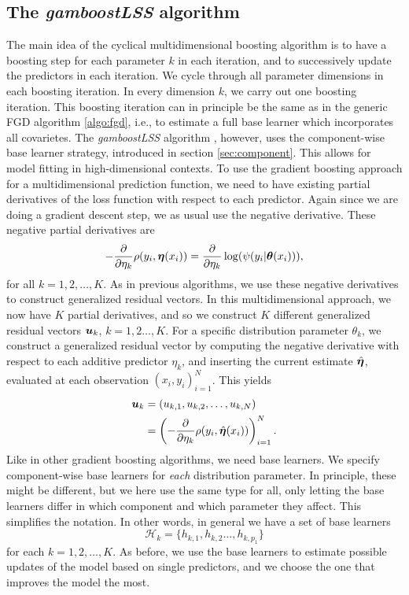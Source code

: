 \subsection{The \textit{gamboostLSS} algorithm}
The main idea of the cyclical multidimensional boosting algorithm is to have a boosting step for each parameter $k$ in each iteration, and to successively update the predictors in each iteration.
We cycle through all parameter dimensions in each boosting iteration.
In every dimension $k$, we carry out one boosting iteration.
This boosting iteration can in principle be the same as in the generic FGD algorithm \eqref{algo:fgd}, i.e., to estimate a full base learner which incorporates all covarietes.
The \textit{gamboostLSS} algorithm \citep{gamboostlss-paper}, however, uses the component-wise base learner strategy, introduced in section \ref{sec:component}.
This allows for model fitting in high-dimensional contexts.
To use the gradient boosting approach for a multidimensional prediction function, we need to have existing partial derivatives of the loss function with respect to each predictor.
Again since we are doing a gradient descent step, we as usual use the negative derivative.
These negative partial derivatives are
\begin{equation*}
    -\frac{\partial}{\partial\eta_k}\rho(y_i,\boldsymbol{\eta}(x_i))=\frac{\partial}{\partial\eta_k}\log(\psi(y_i|\boldsymbol{\theta}(x_i))),
\end{equation*}
for all $k=1,2,\ldots,K$.
As in previous algorithms, we use these negative derivatives to construct generalized residual vectors.
In this multidimensional approach, we now have $K$ partial derivatives, and so we construct $K$ different generalized residual vectors $\bm{u}_k$, $k=1,2\ldots,K$.
For a specific distribution parameter $\theta_k$, we construct a generalized residual vector by computing the negative derivative with respect to each additive predictor $\eta_k$, and inserting the current estimate $\hat{\boldsymbol{\eta}}$, evaluated at each observation $(x_i,y_i)_{i=1}^N$.
This yields
\begin{align*}
    \bm{u}_k&=(u_{k,1},u_{k,2},\ldots,u_{k,N})\\
    &=\left(-\frac{\partial}{\partial \eta_k}\rho(y_i,\hat{\boldsymbol{\eta}}(x_i))\right)_{i=1}^N.
\end{align*}
Like in other gradient boosting algorithms, we need base learners.
We specify component-wise base learners for \textit{each} distribution parameter.
In principle, these might be different, but we here use the same type for all, only letting the base learners differ in which component and which parameter they affect.
This simplifies the notation.
In other words, in general we have a set of base learners
\begin{equation*}
    \mathcal{H}_{k}=\{h_{k,1},h_{k,2}\ldots,h_{k,p_1}\}
\end{equation*}
for each $k=1,2,\ldots,K$.
As before, we use the base learners to estimate possible updates of the model based on single predictors, and we choose the one that improves the model the most.

